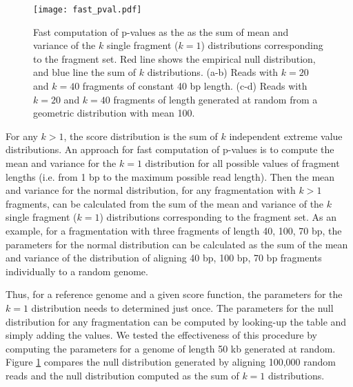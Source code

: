 \begin{figure}[t!]
\centering
\texttt{[image: fast\_pval.pdf]}
\caption[Fast computation of p-values]{
  Fast computation of p-values as the as the sum of mean and variance of
  the $k$ single fragment ($k=1$) distributions corresponding to the
  fragment set.
  Red line shows the empirical null distribution, and blue line the sum
  of $k$ distributions.
  (a-b) Reads with $k=20$ and $k=40$ fragments of constant 40 bp length.
  (c-d) Reads with $k=20$ and $k=40$ fragments of length generated at
  random from a geometric distribution with mean 100.}
\label{fast_pval}
\end{figure}

For any $k > 1$, the score distribution is the sum of $k$ independent
extreme value distributions. An approach for fast computation of
p-values is to compute the mean and variance for the $k=1$ distribution
for all possible values of fragment lengths (i.e. from 1 bp to the
maximum possible read length). Then the mean and variance for the normal
distribution, for any fragmentation with $k > 1$ fragments, can be
calculated from the sum of the mean and variance of the $k$ single
fragment ($k=1$) distributions corresponding to the fragment set.
%
As an example, for a fragmentation with three fragments of length 40,
100, 70 bp, the parameters for the normal distribution can be calculated
as the sum of the mean and variance of the distribution of aligning 40
bp, 100 bp, 70 bp fragments individually to a random genome.

Thus, for a reference genome and a given score function, the parameters
for the $k=1$ distribution needs to determined just once. The parameters
for the null distribution for any fragmentation can be computed by
looking-up the table and simply adding the values.
%
We tested the effectiveness of this procedure by computing the
parameters for a genome of length 50 kb generated at random. Figure
\ref{fast_pval} compares the null distribution generated by aligning
100,000 random reads and the null distribution computed as the sum of
$k=1$ distributions.


